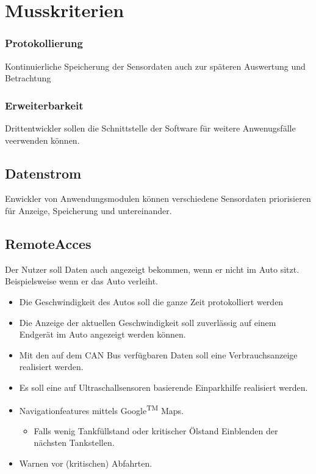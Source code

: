 \documentclass[pflichtenheft.tex]{subfiles}
\begin{document}
\section{Musskriterien}



\subsubsection{\functionnumber Protokollierung} Kontinuierliche Speicherung der Sensordaten auch zur späteren Auswertung und Betrachtung

\subsubsection{\functionnumber Erweiterbarkeit} Drittentwickler sollen die Schnittstelle der Software für weitere Anwenugsfälle veerwenden können.

\subsection{\functionnumber Datenstrom} Enwickler von Anwendungsmodulen können verschiedene Sensordaten priorisieren für Anzeige, Speicherung und untereinander.

\subsection{\functionnumber RemoteAcces} Der Nutzer soll Daten auch angezeigt bekommen, wenn er nicht im Auto sitzt. Beispielsweise wenn er das Auto verleiht.

\begin{itemize}
\item Die Geschwindigkeit des Autos soll die ganze Zeit protokolliert werden
\item Die Anzeige der aktuellen Geschwindigkeit soll zuverlässig auf einem Endgerät im Auto angezeigt werden können.
\item Mit den auf dem CAN Bus verfügbaren Daten soll eine Verbrauchsanzeige realisiert werden.
\item Es soll eine auf Ultraschallsensoren basierende Einparkhilfe realisiert werden.
\item Navigationfeatures mittels Google\textsuperscript{TM} Maps.
\begin{itemize}
	\item Falls wenig Tankfüllstand oder kritischer Ölstand Einblenden der nächsten Tankstellen.
\end{itemize}
\item Warnen vor (kritischen) Abfahrten.
\end{itemize}
\end{document}
